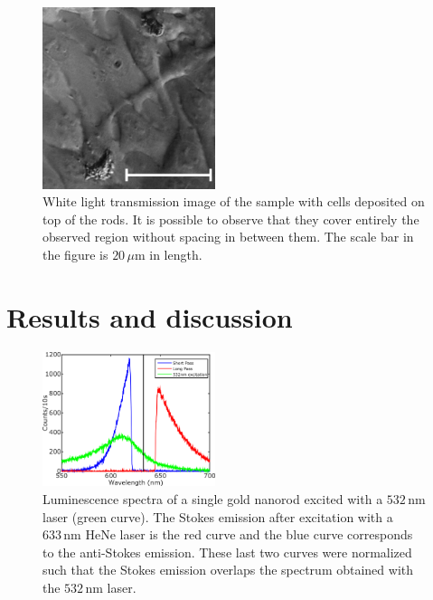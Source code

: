 \documentclass[journal=nalefd,manuscript=letter]{achemso}
\newcommand{\nm}{\ensuremath{\,\textrm{nm}}}
\newcommand{\um}{\ensuremath{\,\mu\textrm{m}}}
\begin{document}
\begin{figure}[htp]
\centering
	\includegraphics[width=0.45\textwidth]{Figures/03_White_Light/white_light_scale.png}
	\caption{White light transmission image of the sample with cells deposited on
	top of the rods. It is possible to observe that they cover entirely the
	observed region without spacing in between them. The scale bar in the figure
	is $20\um$ in length.}
	\label{fig:white-light}
\end{figure}


\section{Results and discussion}

\begin{figure}[htp]
\centering
	\includegraphics[width=0.45\textwidth]{Figures/04_3_Curves/3_curves_final.png}
	\caption{Luminescence spectra of a single gold nanorod excited with a $532\nm$
	laser (green curve). The Stokes emission after excitation with a $633\nm$
	HeNe laser is the red curve and the blue curve corresponds to the anti-Stokes
	emission. These last two curves were normalized such that the Stokes emission
	overlaps the spectrum obtained with the $532\nm$ laser.}
	\label{fig:spectra_rod}
\end{figure}
\end{document}

